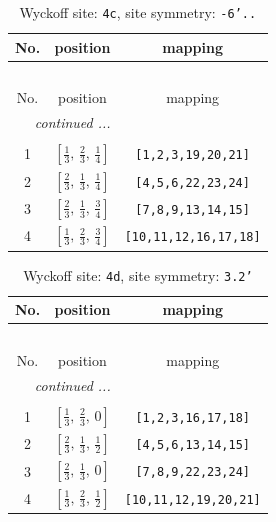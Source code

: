 \documentclass[fleqn,8pt]{jsarticle}
\begin{document}
\renewcommand{\arraystretch}{1.2}
\begin{longtable}{ccc}
\caption{Wyckoff site: {\tt 4c}, site symmetry: {\tt -6'..}}
 \\
 \hline \hline
No. & position & mapping \\ \hline \endfirsthead

\multicolumn{2}{l}{\tablename\ \thetable{}} \\
 \hline \hline
No. & position & mapping \\ \hline \endhead

 \hline \hline
\multicolumn{2}{r}{\footnotesize\it continued ...} \\ \endfoot

 \hline \hline
\multicolumn{2}{r}{} \\ \endlastfoot

1 & $\left[ \frac{1}{3},\, \frac{2}{3},\, \frac{1}{4} \right]$ & {\tt [1,2,3,19,20,21]} \\ \hline
2 & $\left[ \frac{2}{3},\, \frac{1}{3},\, \frac{1}{4} \right]$ & {\tt [4,5,6,22,23,24]} \\ \hline
3 & $\left[ \frac{2}{3},\, \frac{1}{3},\, \frac{3}{4} \right]$ & {\tt [7,8,9,13,14,15]} \\ \hline
4 & $\left[ \frac{1}{3},\, \frac{2}{3},\, \frac{3}{4} \right]$ & {\tt [10,11,12,16,17,18]} \\
\end{longtable}
\renewcommand{\arraystretch}{1.2}
\begin{longtable}{ccc}
\caption{Wyckoff site: {\tt 4d}, site symmetry: {\tt 3.2'}}
 \\
 \hline \hline
No. & position & mapping \\ \hline \endfirsthead

\multicolumn{2}{l}{\tablename\ \thetable{}} \\
 \hline \hline
No. & position & mapping \\ \hline \endhead

 \hline \hline
\multicolumn{2}{r}{\footnotesize\it continued ...} \\ \endfoot

 \hline \hline
\multicolumn{2}{r}{} \\ \endlastfoot

1 & $\left[ \frac{1}{3},\, \frac{2}{3},\, 0 \right]$ & {\tt [1,2,3,16,17,18]} \\ \hline
2 & $\left[ \frac{2}{3},\, \frac{1}{3},\, \frac{1}{2} \right]$ & {\tt [4,5,6,13,14,15]} \\ \hline
3 & $\left[ \frac{2}{3},\, \frac{1}{3},\, 0 \right]$ & {\tt [7,8,9,22,23,24]} \\ \hline
4 & $\left[ \frac{1}{3},\, \frac{2}{3},\, \frac{1}{2} \right]$ & {\tt [10,11,12,19,20,21]} \\
\end{longtable}
\end{document}
